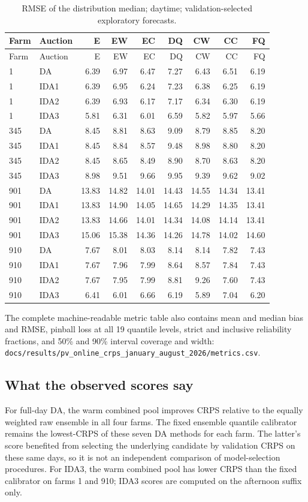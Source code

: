 \documentclass[11pt,a4paper]{article}
\newcommand{\code}[1]{\nolinkurl{#1}}
\begin{document}
\begin{longtable}{llrrrrrrr}
\caption{RMSE of the distribution median; daytime; validation-selected exploratory forecasts.}\\
\toprule Farm & Auction & E & EW & EC & DQ & CW & CC & FQ \\
\midrule\endfirsthead
\toprule Farm & Auction & E & EW & EC & DQ & CW & CC & FQ \\
\midrule\endhead
1 & DA & 6.39 & 6.97 & 6.47 & 7.27 & 6.43 & 6.51 & 6.19 \\
1 & IDA1 & 6.39 & 6.95 & 6.24 & 7.23 & 6.38 & 6.25 & 6.19 \\
1 & IDA2 & 6.39 & 6.93 & 6.17 & 7.17 & 6.34 & 6.30 & 6.19 \\
1 & IDA3 & 5.81 & 6.31 & 6.01 & 6.59 & 5.82 & 5.97 & 5.66 \\
\midrule
345 & DA & 8.45 & 8.81 & 8.63 & 9.09 & 8.79 & 8.85 & 8.20 \\
345 & IDA1 & 8.45 & 8.84 & 8.57 & 9.48 & 8.98 & 8.80 & 8.20 \\
345 & IDA2 & 8.45 & 8.65 & 8.49 & 8.90 & 8.70 & 8.63 & 8.20 \\
345 & IDA3 & 8.98 & 9.51 & 9.66 & 9.95 & 9.39 & 9.62 & 9.02 \\
\midrule
901 & DA & 13.83 & 14.82 & 14.01 & 14.43 & 14.55 & 14.34 & 13.41 \\
901 & IDA1 & 13.83 & 14.90 & 14.05 & 14.65 & 14.29 & 14.35 & 13.41 \\
901 & IDA2 & 13.83 & 14.66 & 14.01 & 14.34 & 14.08 & 14.14 & 13.41 \\
901 & IDA3 & 15.06 & 15.38 & 14.36 & 14.26 & 14.78 & 14.02 & 14.60 \\
\midrule
910 & DA & 7.67 & 8.01 & 8.03 & 8.14 & 8.14 & 7.82 & 7.43 \\
910 & IDA1 & 7.67 & 7.96 & 7.99 & 8.64 & 8.57 & 7.84 & 7.43 \\
910 & IDA2 & 7.67 & 7.95 & 7.99 & 8.81 & 9.26 & 7.60 & 7.43 \\
910 & IDA3 & 6.41 & 6.01 & 6.66 & 6.19 & 5.89 & 7.04 & 6.20 \\
\midrule
\bottomrule\end{longtable}
\normalsize
\noindent The complete machine-readable metric table also contains mean and median bias and RMSE, pinball loss at all 19 quantile levels, strict and inclusive reliability fractions, and 50\% and 90\% interval coverage and width: \code{docs/results/pv_online_crps_january_august_2026/metrics.csv}.

\subsection{What the observed scores say}
For full-day DA, the warm combined pool improves CRPS relative to the equally weighted raw ensemble in all four farms. The fixed ensemble quantile calibrator remains the lowest-CRPS of these seven DA methods for each farm. The latter's score benefited from selecting the underlying candidate by validation CRPS on these same days, so it is not an independent comparison of model-selection procedures. For IDA3, the warm combined pool has lower CRPS than the fixed calibrator on farms 1 and 910; IDA3 scores are computed on the afternoon suffix only.
\end{document}

